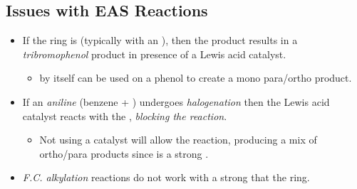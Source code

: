 \begin{itemize}
  \subsection{Issues with EAS Reactions}\label{Issues with EAS Reactions}
  \begin{itemize}
    \item If the ring is  (typically with an ), then the product results in a \emph{tribromophenol} product in presence of a Lewis acid catalyst.
    \begin{itemize}
      \item {} by itself can be used on a phenol to create a mono para/ortho product. 
    \end{itemize}
    \item If an \emph{aniline} (benzene + ) undergoes \emph{halogenation} then the Lewis acid catalyst reacts with the , \emph{blocking the reaction}. 
      \begin{itemize}
        \item Not using a catalyst will allow the reaction, producing a mix of ortho/para products since  is a strong .
      \end{itemize}
    \item \emph{F.C. alkylation} reactions do not work with a strong  that  the ring.
  \end{itemize}
  
\end{itemize}